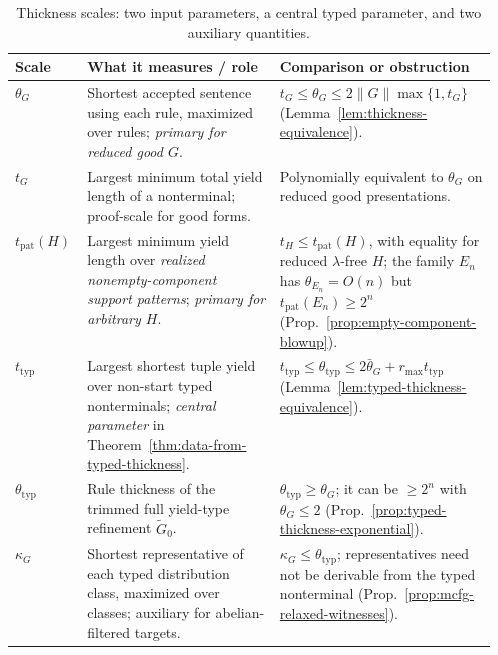 \begin{table}[htbp]
\caption{Thickness scales: two input parameters, a central typed parameter, and two auxiliary quantities.}
\label{tab:thickness-scales}
\centering
\footnotesize
\setlength{\tabcolsep}{3.5pt}
\renewcommand{\arraystretch}{1.18}
\begin{tabularx}{\linewidth}{@{}p{0.155\linewidth}p{0.405\linewidth}X@{}}
\hline
Scale & What it measures / role & Comparison or obstruction\\
\hline
$\theta_G$ & Shortest accepted sentence using each rule, maximized over rules; \emph{primary for reduced good $G$}. & $t_G\le\theta_G\le 2\|G\|\max\{1,t_G\}$ (Lemma~\ref{lem:thickness-equivalence}).\\
$t_G$ & Largest minimum total yield length of a nonterminal; proof-scale for good forms. & Polynomially equivalent to $\theta_G$ on reduced good presentations.\\
$t_{\mathrm{pat}}(H)$ & Largest minimum yield length over \emph{realized nonempty-component support patterns}; \emph{primary for arbitrary $H$}. & $t_H\le t_{\mathrm{pat}}(H)$, with equality for reduced $\lambda$-free $H$; the family $E_n$ has $\theta_{E_n}=O(n)$ but $t_{\mathrm{pat}}(E_n)\ge2^n$ (Prop.~\ref{prop:empty-component-blowup}).\\
$t_{\mathrm{typ}}$ & Largest shortest tuple yield over non-start typed nonterminals; \emph{central parameter} in Theorem~\ref{thm:data-from-typed-thickness}. & $t_{\mathrm{typ}}\le\theta_{\mathrm{typ}}\le2\bar\theta_G+r_{\max}t_{\mathrm{typ}}$ (Lemma~\ref{lem:typed-thickness-equivalence}).\\
$\theta_{\mathrm{typ}}$ & Rule thickness of the trimmed full yield-type refinement $\widetilde G_0$. & $\theta_{\mathrm{typ}}\ge\theta_G$; it can be $\ge2^n$ with $\theta_G\le2$ (Prop.~\ref{prop:typed-thickness-exponential}).\\
$\kappa_G$ & Shortest representative of each typed distribution class, maximized over classes; auxiliary for abelian-filtered targets. & $\kappa_G\le\theta_{\mathrm{typ}}$; representatives need not be derivable from the typed nonterminal (Prop.~\ref{prop:mcfg-relaxed-witnesses}).\\
\hline
\end{tabularx}
\end{table}

